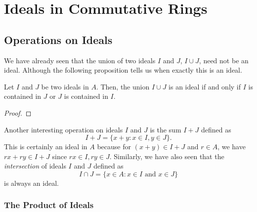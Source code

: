 \chapter{Ideals in Commutative Rings}
\section{Operations on Ideals}
We have already seen that the union of two ideals $I$ and $J$, $I \cup J$, need not be an ideal. Although the following proposition tells us when exactly this is an ideal.
\begin{proposition}\label{prop: union-contained}
    Let $I$ and $J$ be two ideals in $A$. Then, the union $I \cup J$ is an ideal if and only if $I$ is contained in $J$ or $J$ is contained in $I$.
\end{proposition}
\begin{proof}
    
\end{proof}
Another interesting operation on ideals $I$ and $J$ is the sum $I+J$ defined as
\[I+J=\{x+y: x \in I, y \in J\}.\]
This is certainly an ideal in $A$ because for $(x+y) \in I+J$ and $r \in A$, we have $rx+ry \in I+J$ since $rx \in I, ry\in J$. Similarly, we have also seen that the {\it intersection} of ideals $I$ and $J$ defined as
\[I \cap J=\{x \in A: x \in I \text{ and } x \in J\}\]
is always an ideal.

\subsection{The Product of Ideals}

